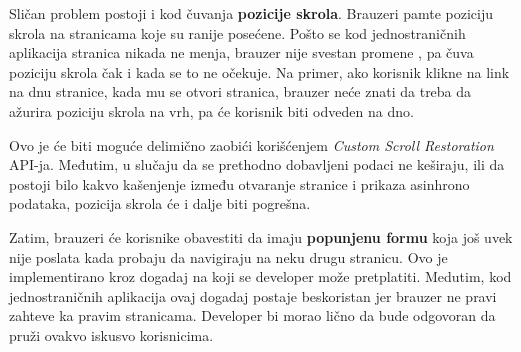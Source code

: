 Sličan problem postoji i kod čuvanja \textbf{pozicije skrola}.
Brauzeri pamte poziciju skrola na stranicama koje su ranije posećene.
Pošto se kod jednostraničnih aplikacija stranica nikada ne menja, brauzer nije svestan promene , pa čuva poziciju skrola čak i kada se to ne očekuje.
Na primer, ako korisnik klikne na link na dnu stranice, kada mu se otvori  stranica, brauzer neće znati da treba da ažurira poziciju skrola na vrh, pa će korisnik biti odveden na dno.

Ovo je će biti moguće delimično zaobići korišćenjem \textit{Custom Scroll Restoration} API-ja.
Međutim, u slučaju da se prethodno dobavljeni podaci ne keširaju, ili da postoji bilo kakvo kašenjenje između otvaranje stranice i prikaza asinhrono podataka, pozicija skrola će i dalje biti pogrešna.

Zatim, brauzeri će korisnike obavestiti da imaju \textbf{popunjenu formu} koja još uvek nije poslata kada probaju da navigiraju na neku drugu stranicu.
Ovo je implementirano kroz dogadaj  na koji se developer može pretplatiti.
Medutim, kod jednostraničnih aplikacija ovaj dogadaj postaje beskoristan jer brauzer ne pravi zahteve ka pravim stranicama.
Developer bi morao lično da bude odgovoran da pruži ovakvo iskusvo korisnicima.
